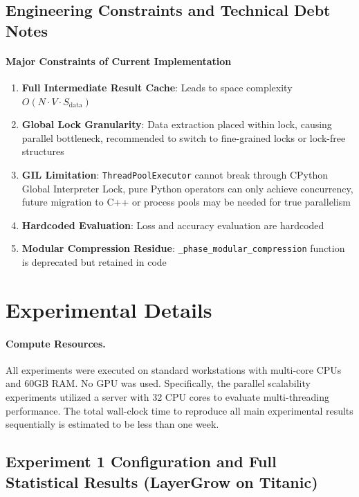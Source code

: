 \subsection{Engineering Constraints and Technical Debt Notes}

\paragraph{Major Constraints of Current Implementation}
\begin{enumerate}
    \item \textbf{Full Intermediate Result Cache}: Leads to space complexity $O(N \cdot V \cdot S_{\mathrm{data}})$
    \item \textbf{Global Lock Granularity}: Data extraction placed within lock, causing parallel bottleneck, recommended to switch to fine-grained locks or lock-free structures
    \item \textbf{GIL Limitation}: \texttt{ThreadPoolExecutor} cannot break through CPython Global Interpreter Lock, pure Python operators can only achieve concurrency, future migration to C++ or process pools may be needed for true parallelism
    \item \textbf{Hardcoded Evaluation}: Loss and accuracy evaluation are hardcoded
    \item \textbf{Modular Compression Residue}: \texttt{\_phase\_modular\_compression} function is deprecated but retained in code
\end{enumerate}

\section{Experimental Details}
\label{sec:appendix_experiments}

\paragraph{Compute Resources.}
All experiments were executed on standard workstations with multi-core CPUs and 60GB RAM. No GPU was used. 
Specifically, the parallel scalability experiments utilized a server with 32 CPU cores to evaluate multi-threading performance. 
The total wall-clock time to reproduce all main experimental results sequentially is estimated to be less than one week.

\subsection{Experiment 1 Configuration and Full Statistical Results (LayerGrow on Titanic)}
\label{sec:appendix_exp1}


